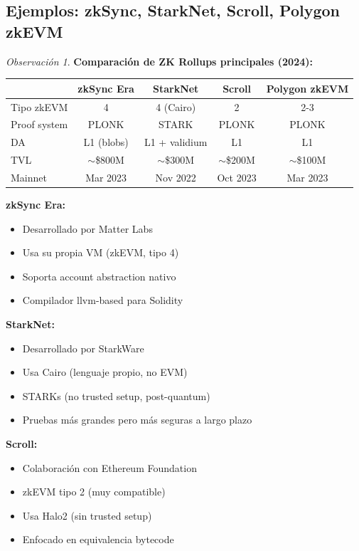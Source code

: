 \documentclass[11pt,a4paper,twoside,openright]{book}
\theoremstyle{definition}
\theoremstyle{plain}
\theoremstyle{remark}
\newtheorem{remark}{Observación}[chapter]
\begin{document}
\subsection{Ejemplos: zkSync, StarkNet, Scroll, Polygon zkEVM}

\begin{remark}
\textbf{Comparación de ZK Rollups principales (2024):}

\begin{center}
\begin{tabular}{lcccc}
\toprule
\textbf{} & \textbf{zkSync Era} & \textbf{StarkNet} & \textbf{Scroll} & \textbf{Polygon zkEVM} \\
\midrule
Tipo zkEVM & 4 & 4 (Cairo) & 2 & 2-3 \\
Proof system & PLONK & STARK & PLONK & PLONK \\
DA & L1 (blobs) & L1 + validium & L1 & L1 \\
TVL & $\sim$\$800M & $\sim$\$300M & $\sim$\$200M & $\sim$\$100M \\
Mainnet & Mar 2023 & Nov 2022 & Oct 2023 & Mar 2023 \\
\bottomrule
\end{tabular}
\end{center}

\textbf{zkSync Era:}
\begin{itemize}
    \item Desarrollado por Matter Labs
    \item Usa su propia VM (zkEVM, tipo 4)
    \item Soporta account abstraction nativo
    \item Compilador llvm-based para Solidity
\end{itemize}

\textbf{StarkNet:}
\begin{itemize}
    \item Desarrollado por StarkWare
    \item Usa Cairo (lenguaje propio, no EVM)
    \item STARKs (no trusted setup, post-quantum)
    \item Pruebas más grandes pero más seguras a largo plazo
\end{itemize}

\textbf{Scroll:}
\begin{itemize}
    \item Colaboración con Ethereum Foundation
    \item zkEVM tipo 2 (muy compatible)
    \item Usa Halo2 (sin trusted setup)
    \item Enfocado en equivalencia bytecode
\end{itemize}


\end{remark}
\end{document}
